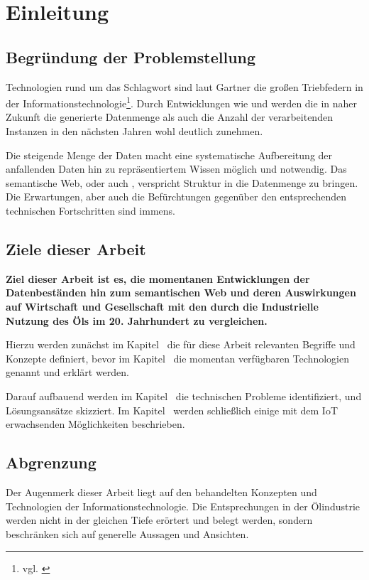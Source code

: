 \section{Einleitung}
\label{sec:einleitung}

\subsection{Begründung der Problemstellung}

Technologien rund um das Schlagwort  sind laut Gartner die großen Triebfedern in der Informationstechnologie\footnote{vgl. \cite{gartner2014}}. Durch Entwicklungen wie  und  werden die in naher Zukunft die generierte Datenmenge als auch die Anzahl der verarbeitenden Instanzen in den nächsten Jahren wohl deutlich zunehmen.

Die steigende Menge der Daten macht eine systematische Aufbereitung der anfallenden Daten hin zu repräsentiertem Wissen möglich und notwendig. Das semantische Web, oder auch , verspricht Struktur in die Datenmenge zu bringen. Die Erwartungen, aber auch die Befürchtungen gegenüber den entsprechenden technischen Fortschritten sind immens.

\subsection{Ziele dieser Arbeit}

\textbf{Ziel dieser Arbeit ist es, die momentanen Entwicklungen der Datenbeständen hin zum semantischen Web und deren Auswirkungen auf Wirtschaft und Gesellschaft mit den durch die Industrielle Nutzung des Öls im 20. Jahrhundert zu vergleichen.}

Hierzu werden zunächst im Kapitel~ die für diese Arbeit relevanten Begriffe und Konzepte definiert, bevor im Kapitel~ die momentan verfügbaren Technologien genannt und erklärt werden. 

Darauf aufbauend werden im Kapitel~ die technischen Probleme identifiziert, und Lösungsansätze skizziert. Im Kapitel~ werden schließlich einige mit dem IoT erwachsenden Möglichkeiten beschrieben. 


\subsection{Abgrenzung}

Der Augenmerk dieser Arbeit liegt auf den behandelten Konzepten und Technologien der Informationstechnologie. Die Entsprechungen in der Ölindustrie werden nicht in der gleichen Tiefe erörtert und belegt werden, sondern beschränken sich auf generelle Aussagen und Ansichten.

